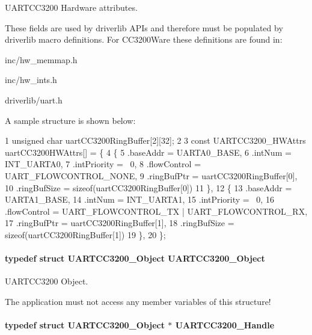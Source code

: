U\+A\+R\+T\+C\+C3200 Hardware attributes. 

These fields are used by driverlib A\+P\+Is and therefore must be populated by driverlib macro definitions. For C\+C3200\+Ware these definitions are found in\+:
\begin{DoxyItemize}
\item inc/hw\+\_\+memmap.\+h
\item inc/hw\+\_\+ints.\+h
\item driverlib/uart.\+h
\end{DoxyItemize}

A sample structure is shown below\+: 
\begin{DoxyCode}
1 unsigned char uartCC3200RingBuffer[2][32];
2 
3 const UARTCC3200\_HWAttrs uartCC3200HWAttrs[] = \{
4     \{
5         .baseAddr = UARTA0\_BASE,
6         .intNum = INT\_UARTA0,
7         .intPriority = ~0,
8         .flowControl = UART\_FLOWCONTROL\_NONE,
9         .ringBufPtr  = uartCC3200RingBuffer[0],
10         .ringBufSize = sizeof(uartCC3200RingBuffer[0])
11     \},
12     \{
13         .baseAddr = UARTA1\_BASE,
14         .intNum = INT\_UARTA1,
15         .intPriority = ~0,
16         .flowControl = UART\_FLOWCONTROL\_TX | UART\_FLOWCONTROL\_RX,
17         .ringBufPtr  = uartCC3200RingBuffer[1],
18         .ringBufSize = sizeof(uartCC3200RingBuffer[1])
19     \},
20 \};
\end{DoxyCode}
\paragraph[{U\+A\+R\+T\+C\+C3200\+\_\+\+Object}]{\setlength{\rightskip}{0pt plus 5cm}typedef struct {\bf U\+A\+R\+T\+C\+C3200\+\_\+\+Object}  {\bf U\+A\+R\+T\+C\+C3200\+\_\+\+Object}}\label{_u_a_r_t_c_c3200_8h_ab955379efacdd1121191c43ef60c6389}


U\+A\+R\+T\+C\+C3200 Object. 

The application must not access any member variables of this structure! 
\paragraph[{U\+A\+R\+T\+C\+C3200\+\_\+\+Handle}]{\setlength{\rightskip}{0pt plus 5cm}typedef struct {\bf U\+A\+R\+T\+C\+C3200\+\_\+\+Object} $\ast$ {\bf U\+A\+R\+T\+C\+C3200\+\_\+\+Handle}}\label{_u_a_r_t_c_c3200_8h_a7918e9066f5ecdeaba9075bf4fe71157}


